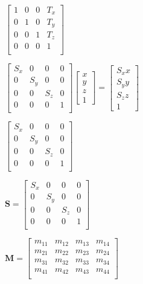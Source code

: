 \documentclass[12pt]{article}
\begin{document}
\vspace{4ex}

$
\begin{bmatrix} 
1 & 0 & 0 & T_x \\ 
0 & 1 & 0 & T_y \\ 
0 & 0 & 1 & T_z \\ 
0 & 0 & 0 & 1 \\ 
\end{bmatrix}
$

\vspace{4ex}

$
\begin{bmatrix} 
S_x & 0 & 0 & 0 \\ 
0 & S_y & 0 & 0 \\ 
0 & 0 & S_z & 0 \\ 
0 & 0 & 0 & 1 \\ 
\end{bmatrix}
\begin{bmatrix} 
x \\
y \\
z \\
1
\end{bmatrix}
=
\begin{bmatrix} 
S_xx \\ 
S_yy \\
S_zz \\
1
\end{bmatrix}
$


\vspace{4ex}

$
\begin{bmatrix} 
S_x & 0 & 0 & 0 \\ 
0 & S_y & 0 & 0 \\ 
0 & 0 & S_z & 0 \\ 
0 & 0 & 0 & 1 \\ 
\end{bmatrix}
$


\vspace{4ex}

$
\boldsymbol{S}=
\begin{bmatrix} 
S_x & 0 & 0 & 0 \\ 
0 & S_y & 0 & 0 \\ 
0 & 0 & S_z & 0 \\ 
0 & 0 & 0 & 1 \\ 
\end{bmatrix}
$

\vspace{4ex}

$
\boldsymbol{M}=
\begin{bmatrix} 
m_{11} & m_{12} & m_{13} & m_{14} \\ 
m_{21} & m_{22} & m_{23} & m_{24} \\ 
m_{31} & m_{32} & m_{33} & m_{34} \\ 
m_{41} & m_{42} & m_{43} & m_{44} \\ 
\end{bmatrix}
$
\end{document}
